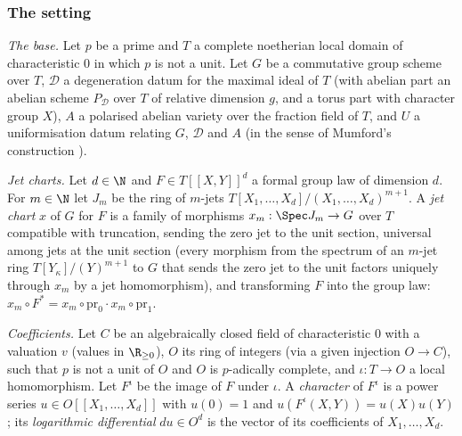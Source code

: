 \subsubsection{The setting}\label{sec:pf:sh-local:chartsetting}
\begin{definition}\label{pf:sh-local:def:jetchart}
\emph{The base.} Let $p$ be a prime and $T$ a complete noetherian local domain of characteristic $0$ in which $p$
is not a unit. Let $G$ be a commutative group scheme over $T$, $\mathcal D$ a degeneration datum for the maximal
ideal of $T$ (with abelian part an abelian scheme $P_{\mathcal D}$ over $T$ of relative dimension $g$, and a torus
part with character group $X$), $A$ a polarised abelian variety over the fraction field of $T$, and $U$ a
uniformisation datum relating $G$, $\mathcal D$ and $A$ (in the sense of Mumford's construction
\cite[Ch.~III]{FaltingsChai1990}).

\emph{Jet charts.} Let $d\in\N$ and $F\in T[[X,Y]]^d$ a formal group law of dimension $d$. For $m\in\N$ let $J_m$ be
the ring of $m$-jets $T[X_1,\dots,X_d]/(X_1,\dots,X_d)^{m+1}$. A \emph{jet chart} $x$ of $G$ for $F$ is a family of
morphisms $x_m:\Spec J_m\to G$ over $T$ compatible with truncation, sending the zero jet to the unit section,
universal among jets at the unit section (every morphism from the spectrum of an $m$-jet ring $T[Y_\kappa]/(Y)^{m+1}$
to $G$ that sends the zero jet to the unit factors uniquely through $x_m$ by a jet homomorphism), and transforming
$F$ into the group law: $x_m\circ F^*=x_m\circ\mathrm{pr}_0\cdot x_m\circ\mathrm{pr}_1$.

\emph{Coefficients.} Let $C$ be an algebraically closed field of characteristic $0$ with a valuation $v$ (values in
$\R_{\ge0}$), $O$ its ring of integers (via a given injection $O\to C$), such that $p$ is not a unit of $O$ and $O$ is
$p$-adically complete, and $\iota:T\to O$ a local homomorphism. Let $F^\iota$ be the image of $F$ under $\iota$. A
\emph{character} of $F^\iota$ is a power series $u\in O[[X_1,\dots,X_d]]$ with $u(0)=1$ and
$u(F^\iota(X,Y))=u(X)u(Y)$; its \emph{logarithmic differential} $du\in O^d$ is the vector of its coefficients of
$X_1,\dots,X_d$.
\end{definition}

